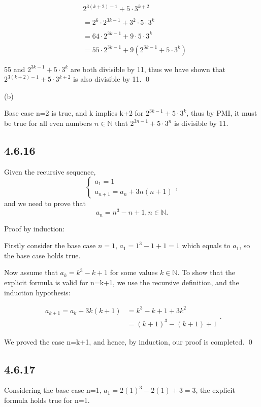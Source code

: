\documentclass{article}
\begin{document}
$$\begin{aligned}&2^{3(k+2)-1}+5\cdot3^{k+2}\\\\&=2^6\cdot2^{3k-1}+3^2\cdot5\cdot3^k\\\\&=64\cdot2^{3k-1}+9\cdot5\cdot3^k\\\\&=55\cdot2^{3k-1}+9\left(2^{3k-1}+5\cdot3^k\right)\end{aligned}$$

55 and $2^{3k-1}+5\cdot 3^k$ are both divisible by 11, thus we have shown that $2^{3(k+2)-1}+5\cdot 3^{k+2}$ is also divisible by 11. \qed

(b)

Base case n=2 is true, and k implies k+2 for $2^{3k-1}+5\cdot 3^k$, thus by PMI, it must be true for all even numbers $n\in\mathbb{N}$ that $2^{3n-1}+5\cdot 3^n$ is divisible by 11.

\subsection*{4.6.16}

Given the recursive sequence, $$\begin{cases}a_{1}=1\\a_{n+1}=a_{n}+3n(n+1)\end{cases},$$ and we need to prove that $$a_{n}=n^{3}-n+1, n\in\mathbb{N}.$$

Proof by induction:

Firstly consider the base case $n=1$, $a_1=1^3-1+1=1$ which equals to $a_1$, so the base case holds true.

Now assume that $a_k=k^3-k+1$ for some values $k\in\mathbb{N}$. To show that the explicit formula is valid for n=k+1, we use the recursive definition, and the induction hypothesis:

$$\begin{aligned}a_{k+1}=a_{k}+3k(k+1)&=k^{3}-k+1+3k^{2}\\&=(k+1)^{3}-(k+1)+1\end{aligned}.$$

We proved the case n=k+1, and hence, by induction, our proof is completed. \qed

\subsection*{4.6.17}

Considering the base case n=1, $a_1=2(1)^3-2(1)+3=3$, the explicit formula holds true for n=1.
\end{document}
